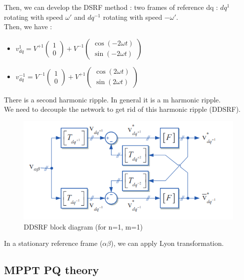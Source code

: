 \documentclass[../main.tex]{subfiles}
\begin{document}
Then, we can develop the DSRF method : two frames of reference dq : $dq^{1}$ rotating with speed $\omega'$ and $dq^{-1}$ rotating with speed $-\omega'$.\\
Then, we have : \begin{itemize}
    \item $v_{dq}^1 = V^{+1} \begin{pmatrix}
        1 \\ 0
    \end{pmatrix} + V^{-1} \begin{pmatrix}
        \cos(-2\omega t)\\ \sin(-2\omega t)
    \end{pmatrix}$
    \item $v_{dq}^{-1} = V^{-1} \begin{pmatrix}
        1 \\ 0
    \end{pmatrix} + V^{+1} \begin{pmatrix}
        \cos(2\omega t)\\ \sin(2\omega t)
    \end{pmatrix}$
\end{itemize}

There is a second harmonic ripple. In general it is a m harmonic ripple.\\

We need to decouple the network to get rid of this harmonic ripple (DDSRF).\\

\begin{figure}
    \centering
    \includegraphics[width=0.8\linewidth]{IMAGES/Indus_el/Screenshot from 2024-11-18 09-23-18.png}
    \caption{DDSRF block diagram (for n=1, m=1)}
\end{figure}

In a stationary reference frame ($\alpha \beta$), we can apply Lyon transformation.\\



\subsection{MPPT PQ theory}
\end{document}
